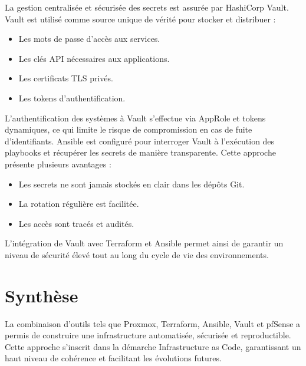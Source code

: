 La gestion centralisée et sécurisée des secrets est assurée par HashiCorp Vault.
Vault est utilisé comme source unique de vérité pour stocker et distribuer :
\begin{itemize}
	\item Les mots de passe d’accès aux services.
	\item Les clés API nécessaires aux applications.
	\item Les certificats TLS privés.
	\item Les tokens d’authentification.
\end{itemize}

L’authentification des systèmes à Vault s’effectue via AppRole et tokens dynamiques, ce qui limite le risque de compromission en cas de fuite d’identifiants.
Ansible est configuré pour interroger Vault à l’exécution des playbooks et récupérer les secrets de manière transparente.
Cette approche présente plusieurs avantages :
\begin{itemize}
	\item Les secrets ne sont jamais stockés en clair dans les dépôts Git.
	\item La rotation régulière est facilitée.
	\item Les accès sont tracés et audités.
\end{itemize}

L’intégration de Vault avec Terraform et Ansible permet ainsi de garantir un niveau de sécurité élevé tout au long du cycle de vie des environnements.

\section{Synthèse}

La combinaison d’outils tels que Proxmox, Terraform, Ansible, Vault et pfSense a permis de construire une infrastructure automatisée, sécurisée et reproductible. Cette approche s’inscrit dans la démarche Infrastructure as Code, garantissant un haut niveau de cohérence et facilitant les évolutions futures.

